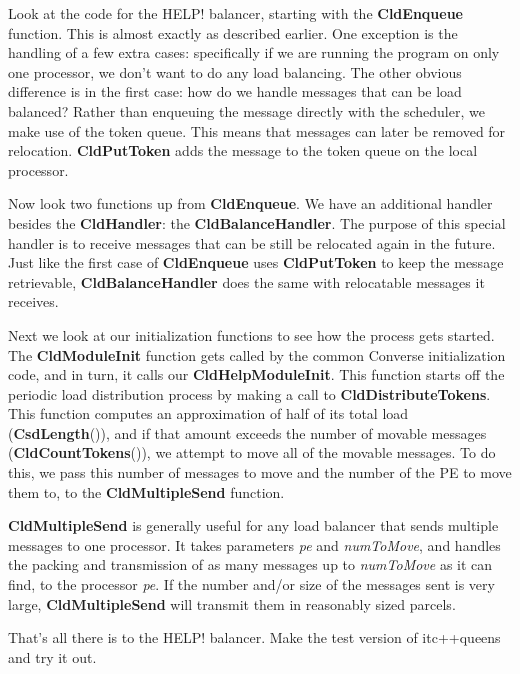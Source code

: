 Look at the code for the HELP! balancer, starting with the {\bf CldEnqueue}
function.  This is almost exactly as described earlier.  One exception is the
handling of a few extra cases: specifically if we are running the program on
only one processor, we don't want to do any load balancing.  The other obvious
difference is in the first case: how do we handle messages that can be load
balanced?  Rather than enqueuing the message directly with the scheduler, we
make use of the token queue.  This means that messages can later be removed
for relocation.  {\bf CldPutToken} adds the message to the token queue on the
local processor.

Now look two functions up from {\bf CldEnqueue}.  We have an additional
handler besides the {\bf CldHandler}: the {\bf CldBalanceHandler}.  The
purpose of this special handler is to receive messages that can be still be
relocated again in the future.  Just like the first case of {\bf CldEnqueue}
uses {\bf CldPutToken} to keep the message retrievable, {\bf
CldBalanceHandler} does the same with relocatable messages it receives.

Next we look at our initialization functions to see how the process gets
started.  The {\bf CldModuleInit} function gets called by the common Converse
initialization code, and in turn, it calls our {\bf CldHelpModuleInit}.  This
function starts off the periodic load distribution process by making a call to
{\bf CldDistributeTokens}.  This function computes an approximation of half of
its total load ({\bf CsdLength}()), and if that amount exceeds the number of
movable messages ({\bf CldCountTokens}()), we attempt to move all of the
movable messages.  To do this, we pass this number of messages to move and the
number of the PE to move them to, to the {\bf CldMultipleSend} function.

{\bf CldMultipleSend} is generally useful for any load balancer that sends
multiple messages to one processor.  It takes parameters {\sl pe} and {\sl
numToMove}, and handles the packing and transmission of as many messages up to
{\sl numToMove} as it can find, to the processor {\sl pe}.  If the number
and/or size of the messages sent is very large, {\bf CldMultipleSend} will
transmit them in reasonably sized parcels.

That's all there is to the HELP! balancer.  Make the test version of
itc++queens and try it out.


